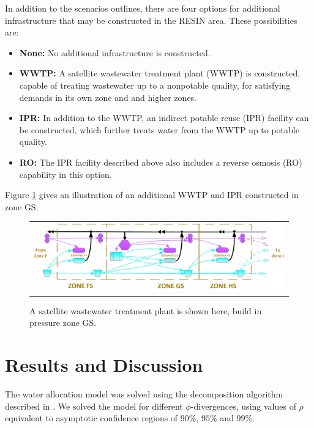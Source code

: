 \documentclass[opre,nonblindrev]{informs3} %
\begin{document}
In addition to the scenarios outlines, there are four options for additional infrastructure that may be constructed in the RESIN area.
These possibilities are:
\begin{itemize}
	\item \textbf{None:} No additional infrastructure is constructed.
	\item \textbf{WWTP:} A satellite wastewater treatment plant (WWTP) is constructed, capable of treating wastewater up to a nonpotable quality, for satisfying demands in its own zone and and higher zones.
	\item \textbf{IPR:} In addition to the WWTP, an indirect potable reuse (IPR) facility can be constructed, which further treats water from the WWTP up to potable quality.
	\item \textbf{RO:} The IPR facility described above also includes a reverse osmosis (RO) capability in this option.
\end{itemize}
Figure \ref{fig:tucson_zones_wwtp} gives an illustration of an additional WWTP and IPR constructed in zone GS.

\begin{figure}
	\FIGURE
	{%
		\begin{tabular}{c}
			\includegraphics*[width=.8\textwidth]{tucson_water_images/zones_south_ipr.png}%
		\end{tabular}
	}
	{
		A satellite wastewater treatment plant is shown here, build in pressure zone GS.
		\label{fig:tucson_zones_wwtp}
	}
	{}
\end{figure}



\section{Results and Discussion}
\label{sec:comp}

The water allocation model was solved using the decomposition algorithm described in \cite{love2013phi}.
We solved the model for different $\phi$-divergences, using values of $\rho$ equivalent to asymptotic confidence regions of $90\%$, $95\%$ and $99\%$.
\end{document}
